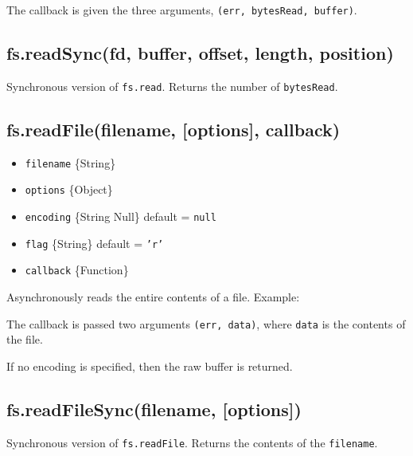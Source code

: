 The callback is given the three arguments,
\texttt{(err, bytesRead, buffer)}.

\subsection{fs.readSync(fd, buffer, offset, length, position)}

Synchronous version of \texttt{fs.read}. Returns the number of
\texttt{bytesRead}.

\subsection{fs.readFile(filename, {[}options{]}, callback)}

\begin{itemize}
\item
  \texttt{filename} \{String\}
\item
  \texttt{options} \{Object\}
\item
  \texttt{encoding} \{String \textbar{} Null\} default = \texttt{null}
\item
  \texttt{flag} \{String\} default = \texttt{'r'}
\item
  \texttt{callback} \{Function\}
\end{itemize}

Asynchronously reads the entire contents of a file. Example:

\begin{Shaded}
\begin{Highlighting}[]
\NormalTok{(}\NormalTok{, } 
    
\NormalTok{\});}
\end{Highlighting}
\end{Shaded}

The callback is passed two arguments \texttt{(err, data)}, where
\texttt{data} is the contents of the file.

If no encoding is specified, then the raw buffer is returned.

\subsection{fs.readFileSync(filename, {[}options{]})}

Synchronous version of \texttt{fs.readFile}. Returns the contents of the
\texttt{filename}.

